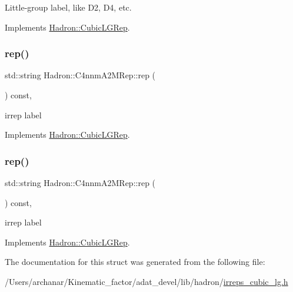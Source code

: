Little-\/group label, like D2, D4, etc. 

Implements \mbox{\hyperlink{structHadron_1_1CubicLGRep_a9bdb14b519a611d21379ed96a3a9eb41}{Hadron\+::\+Cubic\+L\+G\+Rep}}.

\mbox{\label{structHadron_1_1C4nnmA2MRep_a08a21eab24db1e7b93cde52766cfee0b}} 
\subsubsection{\texorpdfstring{rep()}{rep()}\hspace{0.1cm}{\footnotesize\ttfamily [1/2]}}
{\footnotesize\ttfamily std\+::string Hadron\+::\+C4nnm\+A2\+M\+Rep\+::rep (\begin{DoxyParamCaption}{ }\end{DoxyParamCaption}) const\hspace{0.3cm}{\ttfamily [inline]}, {\ttfamily [virtual]}}

irrep label 

Implements \mbox{\hyperlink{structHadron_1_1CubicLGRep_a50f5ddbb8f4be4cee0106fa9e8c75e6c}{Hadron\+::\+Cubic\+L\+G\+Rep}}.

\mbox{\label{structHadron_1_1C4nnmA2MRep_a08a21eab24db1e7b93cde52766cfee0b}} 
\subsubsection{\texorpdfstring{rep()}{rep()}\hspace{0.1cm}{\footnotesize\ttfamily [2/2]}}
{\footnotesize\ttfamily std\+::string Hadron\+::\+C4nnm\+A2\+M\+Rep\+::rep (\begin{DoxyParamCaption}{ }\end{DoxyParamCaption}) const\hspace{0.3cm}{\ttfamily [inline]}, {\ttfamily [virtual]}}

irrep label 

Implements \mbox{\hyperlink{structHadron_1_1CubicLGRep_a50f5ddbb8f4be4cee0106fa9e8c75e6c}{Hadron\+::\+Cubic\+L\+G\+Rep}}.



The documentation for this struct was generated from the following file\+:\begin{DoxyCompactItemize}
\item 
/\+Users/archanar/\+Kinematic\+\_\+factor/adat\+\_\+devel/lib/hadron/\mbox{\hyperlink{lib_2hadron_2irreps__cubic__lg_8h}{irreps\+\_\+cubic\+\_\+lg.\+h}}\end{DoxyCompactItemize}
